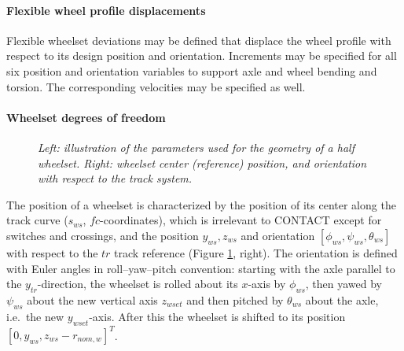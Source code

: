 \documentclass[12pt]{report}
\begin{document}

\paragraph{Flexible wheel profile displacements}

Flexible wheelset deviations may be defined that displace the wheel
profile with respect to its design position and orientation.
Increments may be specified for all six position and orientation variables
to support axle and wheel bending and torsion. The corresponding velocities
may be specified as well.

\paragraph{Wheelset degrees of freedom}

\begin{figure}[bt]
\centering
{}
\hspace{10mm}
\caption{\em Left: illustration of the parameters used for the geometry of
        a half wheelset. Right: wheelset center (reference) position,
        and orientation with respect to the track system.}
\label{fig:wheel_coord}
\end{figure}

The position of a wheelset is characterized by the position of its center
along the track curve ($s_{ws}$, $fc$-coordinates), which is irrelevant to
CONTACT except for switches and crossings, and the position $y_{ws},
z_{ws}$ and orientation $[\phi_{ws}, \psi_{ws}, \theta_{ws}]$ with respect
to the $tr$ track reference (Figure \ref{fig:wheel_coord}, right). The
orientation is defined with Euler angles in roll--yaw--pitch convention:
starting with the axle parallel to the $y_{tr}$-direction, the wheelset is
rolled about its $x$-axis by $\phi_{ws}$, then yawed by $\psi_{ws}$ about
the new vertical axis $z_{wset}$ and then pitched by $\theta_{ws}$ about
the axle, i.e.\ the new $y_{wset}$-axis. After this the wheelset is shifted
to its position $[0,y_{ws},z_{ws}-r_{nom,w}]^T$.
\end{document}
